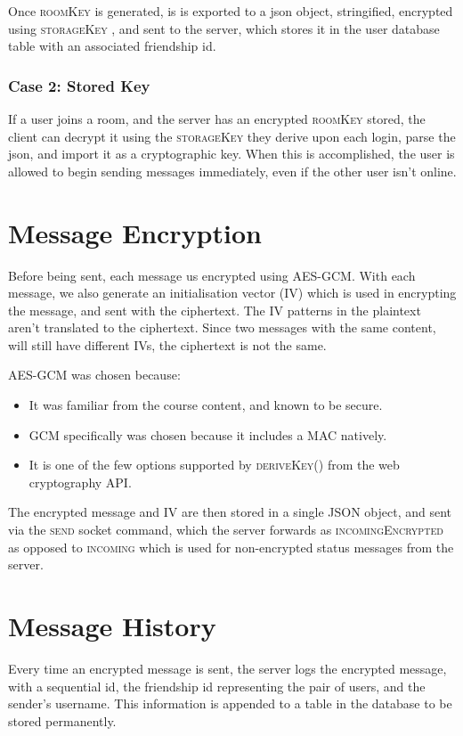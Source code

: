 \documentclass[12pt]{article}
\newcommand{\bryce}{\hfill\normalsize\sc [bkni0201]}
\newcommand{\rkey}{\textsc{roomKey} }
\newcommand{\skey}{\textsc{storageKey} }
\begin{document}
Once \rkey is generated, is is exported to a json object, stringified, encrypted using \skey, and sent to the server, which stores it in the user database table with an associated friendship id.

\subsubsection{Case 2: Stored Key}

If a user joins a room, and the server has an encrypted \rkey stored, the client can decrypt it using the \skey they derive upon each login, parse the json, and import it as a cryptographic key. When this is accomplished, the user is allowed to begin sending messages immediately, even if the other user isn't online.

\section[Encryption]{Message Encryption \bryce}

Before being sent, each message us encrypted using AES-GCM. With each message, we also generate an initialisation vector (IV) which is used in encrypting the message, and sent with the ciphertext. The IV patterns in the plaintext aren't translated to the ciphertext. Since two messages with the same content, will still have different IVs, the ciphertext is not the same.

AES-GCM was chosen because:
\begin{itemize}
    \item It was familiar from the course content, and known to be secure.
    \item GCM specifically was chosen because it includes a MAC natively.
    \item It is one of the few options supported by \textsc{deriveKey()} from the web cryptography API.
\end{itemize}

The encrypted message and IV are then stored in a single JSON object, and sent via the \textsc{send} socket command, which the server forwards as \textsc{incomingEncrypted} as opposed to \textsc{incoming} which is used for non-encrypted status messages from the server.

\section[History]{Message History \bryce}

Every time an encrypted message is sent, the server logs the encrypted message, with a sequential id, the friendship id representing the pair of users, and the sender's username. This information is appended to a table in the database to be stored permanently.
\end{document}
